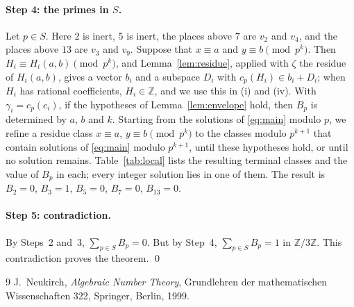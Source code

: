 \documentclass[11pt]{article}
\newcommand{\Z}{\mathbb{Z}}
\begin{document}
\paragraph{Step 4: the primes in $S$.} Let $p\in S$. Here $2$ is inert, $5$ is inert, the places above $7$ are $v_{2}$ and $v_{4}$, and the places above $13$ are $v_{3}$ and $v_{9}$. Suppose that $x\equiv a$ and $y\equiv b\pmod{p^k}$. Then $H_i\equiv H_i(a,b)\pmod{p^k}$, and Lemma~\ref{lem:residue}, applied with $\zeta$ the residue of $H_i(a,b)$, gives a vector $b_i$ and a subspace $D_i$ with $c_p(H_i)\in b_i+D_i$; when $H_i$ has rational coefficients, $H_i\in\Z$, and we use this in (i) and (iv). With $\gamma_i=c_p(c_i)$, if the hypotheses of Lemma~\ref{lem:envelope} hold, then $B_p$ is determined by $a$, $b$ and $k$. Starting from the solutions of \eqref{eq:main} modulo $p$, we refine a residue class $x\equiv a$, $y\equiv b\pmod{p^k}$ to the classes modulo $p^{k+1}$ that contain solutions of \eqref{eq:main} modulo $p^{k+1}$, until these hypotheses hold, or until no solution remains. Table~\ref{tab:local} lists the resulting terminal classes and the value of $B_p$ in each; every integer solution lies in one of them. The result is $B_{2}=0$, $B_{3}=1$, $B_{5}=0$, $B_{7}=0$, $B_{13}=0$.

\paragraph{Step 5: contradiction.} By Steps~2 and~3, $\sum_{p\in S}B_p=0$. But by Step~4, $\sum_{p\in S}B_p=1$ in $\Z/3\Z$. This contradiction proves the theorem.
\qed


\begin{thebibliography}{9}
 J.~Neukirch, \emph{Algebraic Number Theory}, Grundlehren der mathematischen Wissenschaften 322, Springer, Berlin, 1999.
\end{thebibliography}
\end{document}
